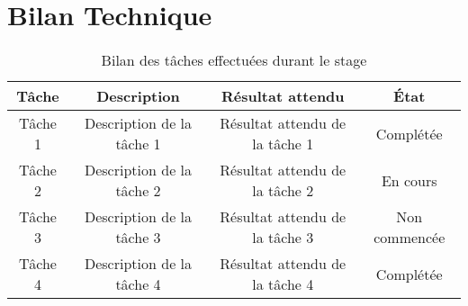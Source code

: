 \section*{Bilan Technique}

\begin{table}[h]
    \centering
    \begin{tabular}{|c|c|c|c|}
        \hline
        \textbf{Tâche} & \textbf{Description} & \textbf{Résultat attendu} & \textbf{État} \\
        \hline
        Tâche 1 & Description de la tâche 1 & Résultat attendu de la tâche 1 & Complétée \\
        \hline
        Tâche 2 & Description de la tâche 2 & Résultat attendu de la tâche 2 & En cours \\
        \hline
        Tâche 3 & Description de la tâche 3 & Résultat attendu de la tâche 3 & Non commencée \\
        \hline
        Tâche 4 & Description de la tâche 4 & Résultat attendu de la tâche 4 & Complétée \\
        \hline
    \end{tabular}
    \caption{Bilan des tâches effectuées durant le stage}
    \label{tab:bilan-technique}
\end{table}

\newpage
